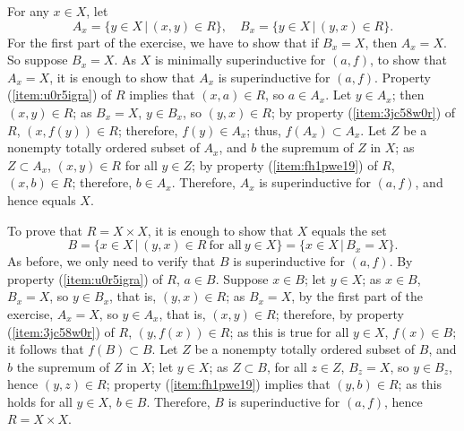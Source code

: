 \documentclass{article}
\begin{document}
\begin{solution}[\ref{exe:9l6q0c66}]
  \label{sol:st5xn271}
  For any \(x \in X\), let
  \begin{displaymath}
    A_x = \{ y \in X \,\vert\, (x, y) \in R \},
    \quad
    B_x = \{ y \in X \,\vert\, (y, x) \in R \}.
  \end{displaymath}
  For the first part of the exercise, we have to show that if
  \(B_x = X\), then \(A_x = X\).  So suppose \(B_x = X\).  As \(X\) is
  minimally superinductive for \((a, f)\), to show that \(A_x = X\),
  it is enough to show that \(A_x\) is superinductive for \((a, f)\).
  Property (\ref{item:u0r5igra}) of \(R\) implies that
  \((x, a) \in R\), so \(a \in A_x\).  Let \(y \in A_x\); then
  \((x, y) \in R\); as \(B_x = X\), \(y \in B_x\), so
  \((y, x) \in R\); by property (\ref{item:3jc58w0r}) of \(R\),
  \((x, f(y)) \in R\); therefore, \(f(y) \in A_x\); thus,
  \(f(A_x) \subset A_x\).  Let \(Z\) be a nonempty totally ordered
  subset of \(A_x\), and \(b\) the supremum of \(Z\) in \(X\); as
  \(Z \subset A_x\), \((x, y) \in R\) for all \(y \in Z\); by property
  (\ref{item:fh1pwe19}) of \(R\), \((x, b) \in R\); therefore,
  \(b \in A_x\).  Therefore, \(A_x\) is superinductive for \((a, f)\),
  and hence equals \(X\).

  To prove that \(R = X \times X\), it is enough to show that \(X\)
  equals the set
  \begin{displaymath}
    B =
    \{ x \in X \,\vert\, (y, x) \in R ~ \text{for all} ~ y \in X \} =
    \{ x \in X \,\vert\, B_x = X \}.
  \end{displaymath}
  As before, we only need to verify that \(B\) is superinductive for
  \((a, f)\).  By property (\ref{item:u0r5igra}) of \(R\),
  \(a \in B\).  Suppose \(x \in B\); let \(y \in X\); as \(x \in B\),
  \(B_x = X\), so \(y \in B_x\), that is, \((y, x) \in R\); as
  \(B_x = X\), by the first part of the exercise, \(A_x = X\), so
  \(y \in A_x\), that is, \((x, y) \in R\); therefore, by property
  (\ref{item:3jc58w0r}) of \(R\), \((y, f(x)) \in R\); as this is true
  for all \(y \in X\), \(f(x) \in B\); it follows that
  \(f(B) \subset B\).  Let \(Z\) be a nonempty totally ordered subset
  of \(B\), and \(b\) the supremum of \(Z\) in \(X\); let \(y \in X\);
  as \(Z \subset B\), for all \(z \in Z\), \(B_z = X\), so
  \(y \in B_z\), hence \((y, z) \in R\); property
  (\ref{item:fh1pwe19}) implies that \((y, b) \in R\); as this holds
  for all \(y \in X\), \(b \in B\).  Therefore, \(B\) is
  superinductive for \((a,f)\), hence \(R = X \times X\).
\end{solution}
\end{document}
